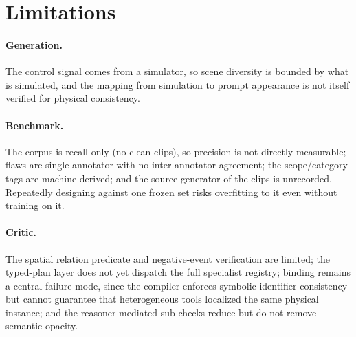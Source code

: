 \section{Limitations}\label{sec:limitations}

\paragraph{Generation.} The control signal comes from a simulator, so scene diversity is
bounded by what is simulated, and the mapping from simulation to prompt appearance is not
itself verified for physical consistency.

\paragraph{Benchmark.} The corpus is recall-only (no clean clips), so precision is
not directly measurable; flaws are single-annotator with no inter-annotator
agreement; the scope/category tags are machine-derived; and the source generator
of the clips is unrecorded. Repeatedly designing against one frozen set risks
overfitting to it even without training on it.

\paragraph{Critic.} The spatial relation predicate and negative-event
verification are limited; the typed-plan layer does not yet dispatch the full
specialist registry; binding remains a central failure mode, since the compiler
enforces symbolic identifier consistency but cannot guarantee that heterogeneous
tools localized the same physical instance; and the reasoner-mediated sub-checks
reduce but do not remove semantic opacity.

